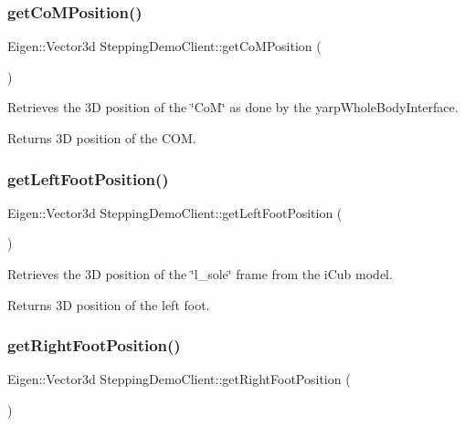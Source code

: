 \subsubsection{\texorpdfstring{get\+Co\+M\+Position()}{getCoMPosition()}}
{\footnotesize\ttfamily Eigen\+::\+Vector3d Stepping\+Demo\+Client\+::get\+Co\+M\+Position (\begin{DoxyParamCaption}{ }\end{DoxyParamCaption})\hspace{0.3cm}{\ttfamily [private]}}

Retrieves the 3D position of the \char`\"{}\+Co\+M\char`\"{} as done by the yarp\+Whole\+Body\+Interface.

\begin{DoxyReturn}{Returns}
3D position of the C\+OM. 
\end{DoxyReturn}
\hypertarget{classSteppingDemoClient_af6a814243828f5136476aa5e99ea0079}{}\label{classSteppingDemoClient_af6a814243828f5136476aa5e99ea0079} 
\subsubsection{\texorpdfstring{get\+Left\+Foot\+Position()}{getLeftFootPosition()}}
{\footnotesize\ttfamily Eigen\+::\+Vector3d Stepping\+Demo\+Client\+::get\+Left\+Foot\+Position (\begin{DoxyParamCaption}{ }\end{DoxyParamCaption})\hspace{0.3cm}{\ttfamily [private]}}

Retrieves the 3D position of the \char`\"{}l\+\_\+sole\char`\"{} frame from the i\+Cub model.

\begin{DoxyReturn}{Returns}
3D position of the left foot. 
\end{DoxyReturn}
\hypertarget{classSteppingDemoClient_ae9c0d72756c109f49c269a7e1b06454a}{}\label{classSteppingDemoClient_ae9c0d72756c109f49c269a7e1b06454a} 
\subsubsection{\texorpdfstring{get\+Right\+Foot\+Position()}{getRightFootPosition()}}
{\footnotesize\ttfamily Eigen\+::\+Vector3d Stepping\+Demo\+Client\+::get\+Right\+Foot\+Position (\begin{DoxyParamCaption}{ }\end{DoxyParamCaption})\hspace{0.3cm}{\ttfamily [private]}}

